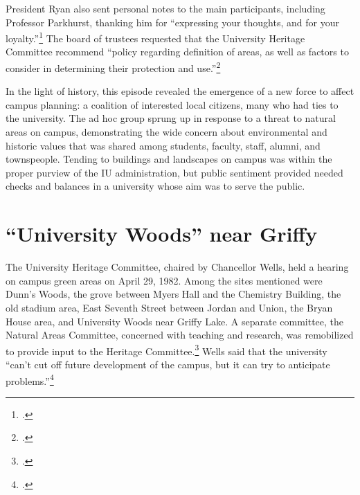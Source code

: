\documentclass[
  american,
  letterpaper,
]{scrreprt}
\begin{document}
President Ryan also sent personal notes to the main participants,
including Professor Parkhurst, thanking him for ``expressing your
thoughts, and for your loyalty.''\footnote{.}
The board of trustees requested that the University Heritage Committee
recommend ``policy regarding definition of areas, as well as factors to
consider in determining their protection and use.''\footnote{.}

In the light of history, this episode revealed the emergence of a new
force to affect campus planning: a coalition of interested local
citizens, many who had ties to the university. The ad hoc group sprung
up in response to a threat to natural areas on campus, demonstrating the
wide concern about environmental and historic values that was shared
among students, faculty, staff, alumni, and townspeople. Tending to
buildings and landscapes on campus was within the proper purview of the
IU administration, but public sentiment provided needed checks and
balances in a university whose aim was to serve the public.

\section{``University Woods'' near
Griffy}\label{university-woods-near-griffy}

The University Heritage Committee, chaired by Chancellor Wells, held a
hearing on campus green areas on April 29, 1982. Among the sites
mentioned were Dunn's Woods, the grove between Myers Hall and the
Chemistry Building, the old stadium area, East Seventh Street between
Jordan and Union, the Bryan House area, and University Woods near Griffy
Lake. A separate committee, the Natural Areas Committee, concerned with
teaching and research, was remobilized to provide input to the Heritage
Committee.\footnote{.} Wells said
that the university ``can't cut off future development of the campus,
but it can try to anticipate problems.''\footnote{.}
\end{document}
